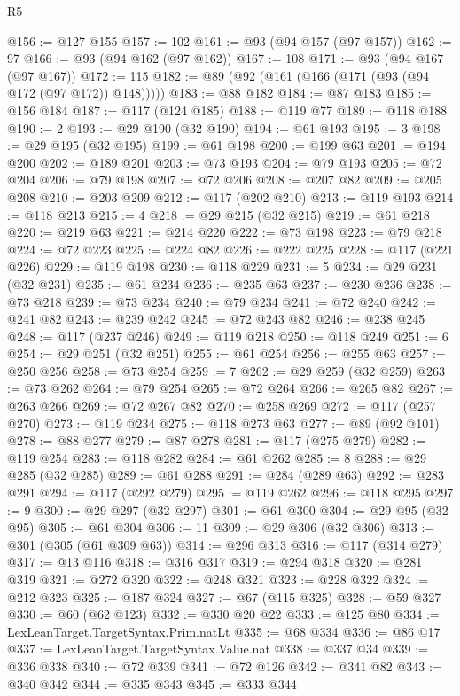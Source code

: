 \begin{lexlean}{R5}
\begin{coremodule}
{{{{{{{{{{{{{{{{{{{{{{{{{{{{{{{{{{{{{{{{{{{{{{{{{{{{{{{{{{{{{{{{{{{{{{{{{{{{{{{{{{{{{{{{{{{{@156 := @127 @155
@157 := 102
@161 := @93 (@94 @157 (@97 @157))
@162 := 97
@166 := @93 (@94 @162 (@97 @162))
@167 := 108
@171 := @93 (@94 @167 (@97 @167))
@172 := 115
@182 := @89 (@92 (@161 (@166 (@171 (@93 (@94 @172 (@97 @172)) @148)))))
@183 := @88 @182
@184 := @87 @183
@185 := @156 @184
@187 := @117 (@124 @185)
@188 := @119 @77
@189 := @118 @188
@190 := 2
@193 := @29 @190 (@32 @190)
@194 := @61 @193
@195 := 3
@198 := @29 @195 (@32 @195)
@199 := @61 @198
@200 := @199 @63
@201 := @194 @200
@202 := @189 @201
@203 := @73 @193
@204 := @79 @193
@205 := @72 @204
@206 := @79 @198
@207 := @72 @206
@208 := @207 @82
@209 := @205 @208
@210 := @203 @209
@212 := @117 (@202 @210)
@213 := @119 @193
@214 := @118 @213
@215 := 4
@218 := @29 @215 (@32 @215)
@219 := @61 @218
@220 := @219 @63
@221 := @214 @220
@222 := @73 @198
@223 := @79 @218
@224 := @72 @223
@225 := @224 @82
@226 := @222 @225
@228 := @117 (@221 @226)
@229 := @119 @198
@230 := @118 @229
@231 := 5
@234 := @29 @231 (@32 @231)
@235 := @61 @234
@236 := @235 @63
@237 := @230 @236
@238 := @73 @218
@239 := @73 @234
@240 := @79 @234
@241 := @72 @240
@242 := @241 @82
@243 := @239 @242
@245 := @72 @243 @82
@246 := @238 @245
@248 := @117 (@237 @246)
@249 := @119 @218
@250 := @118 @249
@251 := 6
@254 := @29 @251 (@32 @251)
@255 := @61 @254
@256 := @255 @63
@257 := @250 @256
@258 := @73 @254
@259 := 7
@262 := @29 @259 (@32 @259)
@263 := @73 @262
@264 := @79 @254
@265 := @72 @264
@266 := @265 @82
@267 := @263 @266
@269 := @72 @267 @82
@270 := @258 @269
@272 := @117 (@257 @270)
@273 := @119 @234
@275 := @118 @273 @63
@277 := @89 (@92 @101)
@278 := @88 @277
@279 := @87 @278
@281 := @117 (@275 @279)
@282 := @119 @254
@283 := @118 @282
@284 := @61 @262
@285 := 8
@288 := @29 @285 (@32 @285)
@289 := @61 @288
@291 := @284 (@289 @63)
@292 := @283 @291
@294 := @117 (@292 @279)
@295 := @119 @262
@296 := @118 @295
@297 := 9
@300 := @29 @297 (@32 @297)
@301 := @61 @300
@304 := @29 @95 (@32 @95)
@305 := @61 @304
@306 := 11
@309 := @29 @306 (@32 @306)
@313 := @301 (@305 (@61 @309 @63))
@314 := @296 @313
@316 := @117 (@314 @279)
@317 := @13 @116
@318 := @316 @317
@319 := @294 @318
@320 := @281 @319
@321 := @272 @320
@322 := @248 @321
@323 := @228 @322
@324 := @212 @323
@325 := @187 @324
@327 := @67 (@115 @325)
@328 := @59 @327
@330 := @60 (@62 @123)
@332 := @330 @20 @22
@333 := @125 @80
@334 := LexLeanTarget.TargetSyntax.Prim.natLt
@335 := @68 @334
@336 := @86 @17
@337 := LexLeanTarget.TargetSyntax.Value.nat
@338 := @337 @34
@339 := @336 @338
@340 := @72 @339
@341 := @72 @126
@342 := @341 @82
@343 := @340 @342
@344 := @335 @343
@345 := @333 @344
}}}}}}}}}}}}}}}}}}}}}}}}}}}}}}}}}}}}}}}}}}}}}}}}}}}}}}}}}}}}}}}}}}}}}}}}}}}}}}}}}}}}}}}}}}}}
\end{coremodule}
\end{lexlean}
